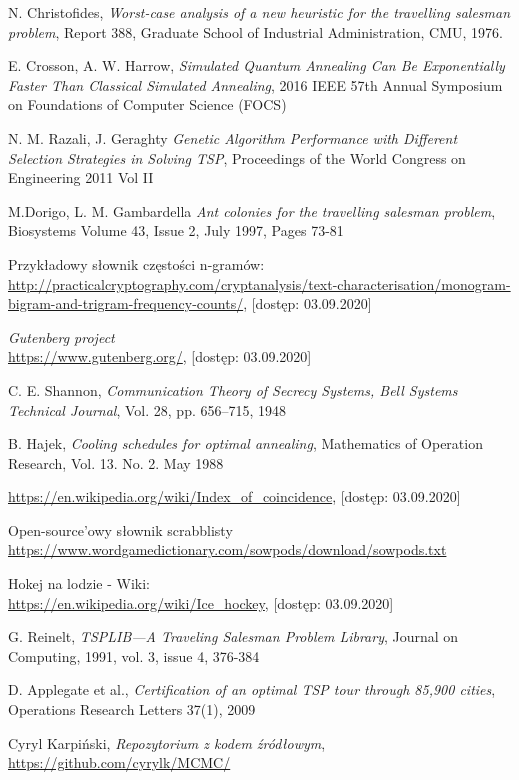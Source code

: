 \documentclass[a4paper]{article}
\theoremstyle{defn}
\theoremstyle{theorem}
\theoremstyle{lemma}
\theoremstyle{cor}
\theoremstyle{fact}
\begin{document}
\begin{thebibliography}{9}
  N. Christofides, \emph{Worst-case analysis of a new heuristic for the travelling salesman problem}, Report 388, Graduate School of Industrial Administration, CMU, 1976.

E. Crosson, A. W. Harrow, \emph{Simulated Quantum Annealing Can Be Exponentially Faster Than Classical Simulated Annealing},
2016 IEEE 57th Annual Symposium on Foundations of Computer Science (FOCS)


N. M. Razali, J. Geraghty \emph{Genetic Algorithm Performance with Different
Selection Strategies in Solving TSP},
Proceedings of the World Congress on Engineering 2011 Vol II

M.Dorigo, L. M. Gambardella \emph{Ant colonies for the travelling salesman problem}, Biosystems
Volume 43, Issue 2, July 1997, Pages 73-81


Przykładowy słownik częstości n-gramów:\\
\href{http://practicalcryptography.com/cryptanalysis/text-characterisation/monogram-bigram-and-trigram-frequency-counts/}{http://practicalcryptography.com/cryptanalysis/text-characterisation/monogram-bigram-and-trigram-frequency-counts/}, [dostęp: 03.09.2020]

\emph{Gutenberg project}\\
\href{https://www.gutenberg.org/}{https://www.gutenberg.org/}, [dostęp: 03.09.2020]

C. E. Shannon, \emph{Communication Theory of Secrecy Systems, Bell Systems Technical Journal}, Vol. 28, pp. 656–715, 1948

B. Hajek, \emph{Cooling schedules for optimal annealing},
Mathematics of Operation Research, Vol. 13. No. 2. May 1988

\href{https://en.wikipedia.org/wiki/Index\_of\_coincidence}{https://en.wikipedia.org/wiki/Index\_of\_coincidence}, [dostęp: 03.09.2020]

Open-source'owy słownik scrabblisty\\
\href{https://www.wordgamedictionary.com/sowpods/download/sowpods.txt}{https://www.wordgamedictionary.com/sowpods/download/sowpods.txt}

Hokej na lodzie - Wiki:\\
\href{https://en.wikipedia.org/wiki/Ice\_hockey}{https://en.wikipedia.org/wiki/Ice\_hockey}, [dostęp: 03.09.2020]

G. Reinelt, \emph{TSPLIB—A Traveling Salesman Problem Library}, Journal on Computing, 1991, vol. 3, issue 4, 376-384

D. Applegate  et al.,  \emph{Certification of an optimal TSP tour through 85,900 cities}, Operations Research Letters 37(1), 2009

Cyryl Karpiński,
\textit{Repozytorium z kodem źródłowym},
\href{https://github.com/cyrylk/MCMC/}{https://github.com/cyrylk/MCMC/}

\end{thebibliography}
\end{document}

